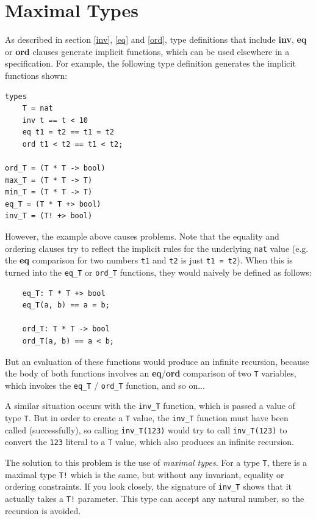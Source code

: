 \documentclass{overturerepchap}
\newcommand{\keyw}[1]{{\bf\ttfamily #1}}
\begin{document}
{\chapter{Maximal Types}\label{sec:maximaltypes}

As described in section \ref{inv}, \ref{eq} and \ref{ord}, type definitions that include \keyw{inv}, \keyw{eq} or \keyw{ord} clauses generate implicit functions, which can be used elsewhere in a specification. For example, the following type definition generates the implicit functions shown:

\begin{lstlisting}
types
	T = nat
	inv t == t < 10
	eq t1 = t2 == t1 = t2
	ord t1 < t2 == t1 < t2;

ord_T = (T * T -> bool)
max_T = (T * T -> T)
min_T = (T * T -> T)
eq_T = (T * T +> bool)
inv_T = (T! +> bool)
\end{lstlisting}

However, the example above causes problems. Note that the equality and ordering clauses try to reflect the implicit rules for the underlying {\tt nat} value (e.g. the \keyw{eq} comparison for two numbers {\tt t1} and {\tt t2} is just {\tt t1 = t2}). When this is turned into the {\tt eq\_T} or {\tt ord\_T} functions, they would naively be defined as follows:

\begin{lstlisting}
    eq_T: T * T +> bool
    eq_T(a, b) == a = b;

    ord_T: T * T -> bool
    ord_T(a, b) == a < b;
\end{lstlisting}

But an evaluation of these functions would produce an infinite recursion, because the body of both functions involves an \keyw{eq}/\keyw{ord} comparison of two {\tt T} variables, which invokes the {\tt eq\_T} / {\tt ord\_T} function, and so on...

A similar situation occurs with the {\tt inv\_T} function, which is passed a value of type {\tt T}. But in order to create a {\tt T} value, the {\tt inv\_T} function must have been called (successfully), so calling {\tt inv\_T(123)} would try to call {\tt inv\_T(123)} to convert the {\tt 123} literal to a {\tt T} value, which also produces an infinite recursion.

The solution to this problem is the use of {\it maximal types}. For a type {\tt T}, there is a maximal type {\tt T!} which is the same, but without any invariant, equality or ordering constraints. If you look closely, the signature of {\tt inv\_T} shows that it actually takes a {\tt T!} parameter. This type can accept any natural number, so the recursion is avoided.

}
\end{document}

